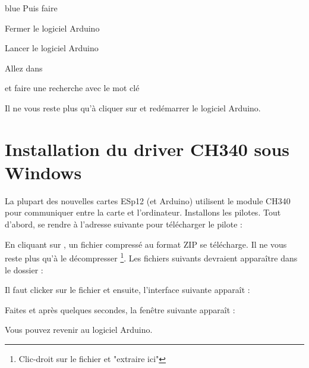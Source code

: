 {\begin{items}{blue}{\Triangle}
    Puis faire 

    \item Fermer le logiciel Arduino

    \item Lancer le logiciel Arduino
    \item Allez dans  
    
    et faire une recherche avec le mot clé 


    Il ne vous reste plus qu'à cliquer sur  et redémarrer le logiciel Arduino.
\end{items}

\section{Installation du driver CH340 sous Windows}

La plupart des nouvelles cartes ESp12 (et Arduino) utilisent le module CH340 pour communiquer entre la carte et l'ordinateur.
Installons les pilotes. Tout d'abord, se rendre à l'adresse suivante pour télécharger le pilote :


En cliquant sur , un fichier compressé au format ZIP se télécharge. Il ne vous reste plus 
qu'à le décompresser \footnote{Clic-droit sur le fichier et "extraire ici"}.
Les fichiers suivants devraient apparaître dans le dossier : 


Il faut clicker sur le fichier  et ensuite, l'interface suivante apparaît : 


Faites  et après quelques secondes, la fenêtre suivante apparaît : 


Vous pouvez revenir au logiciel Arduino.

}
